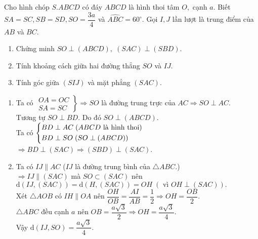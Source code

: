 \begin{bt}%
	Cho hình chóp $ S.ABCD $ có đáy $ ABCD $ là hình thoi tâm $ O, $ cạnh $ a $. Biết $ SA=SC, SB=SD, SO=\dfrac{3a}{4} $ và $ \widehat{ABC}=60^\circ .$ Gọi $ I,J $ lần lượt là trung điểm của $ AB $ và $ BC. $
	\begin{enumerate}
		\item Chứng minh $ SO\perp (ABCD),\;(SAC)\perp(SBD). $
		\item Tính khoảng cách giữa hai đường thẳng $ SO $ và $ IJ. $
		\item Tính góc giữa $ (SIJ) $ và mặt phẳng $ (SAC). $
	\end{enumerate}
	\loigiai
	{\begin{center}
	\end{center}
	\begin{enumerate}
	\item Ta có $\left.\begin{aligned}OA=OC\\SA=SC\end{aligned}\right\rbrace \Rightarrow SO$ là đường trung trực của $AC\Rightarrow SO\perp AC.$\\Tương tự $SO\perp BD$. Do đó $SO\perp(ABCD).$\\
	Ta có $\left\{\begin{aligned}&BD\perp AC\;(ABCD \text{ là hình thoi})\\&BD\perp SO\;(SO\perp(ABCD))\end{aligned}\right.$\\$\Rightarrow BD\perp (SAC)\Rightarrow (SBD)\perp (SAC)$.
	\item Ta có $IJ\parallel AC$ ($IJ$ là đường trung bình của $\triangle ABC$.)\\$\Rightarrow IJ\parallel (SAC)$ mà $SO\subset (SAC)$ nên $\text{d}(IJ,(SAC))=\text{d}(H,(SAC))=OH\;(\text{ vì }OH\perp (SAC)).$\\Xét $\triangle AOB$ có $IH\parallel OA$ nên $\dfrac{OH}{OB}=\dfrac{AI}{AB}=\dfrac{1}{2}\Rightarrow OH=\dfrac{OB}{2}.$\\$\triangle ABC$ đều cạnh $a$ nên $OB=\dfrac{a\sqrt{3}}{2}\Rightarrow OH=\dfrac{a\sqrt{3}}{4}.$\\Vậy $\text{d}(IJ,SO)=\dfrac{a\sqrt{3}}{4}.$

\end{enumerate}}
\end{bt}
